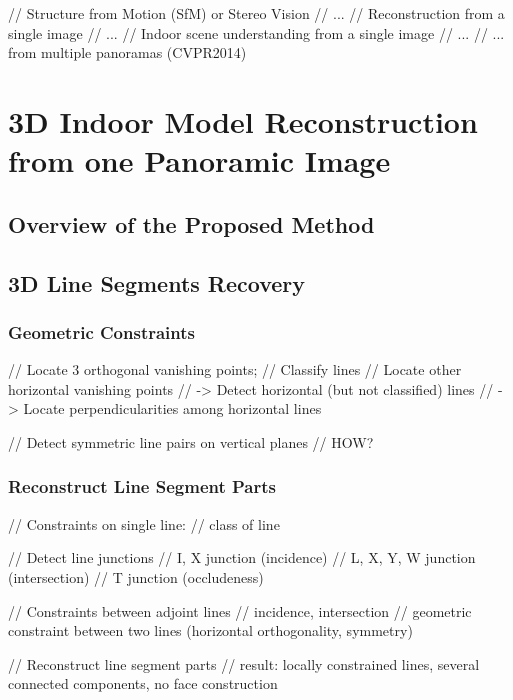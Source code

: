 \documentclass[runningheads]{llncs}
\begin{document}
// Structure from Motion (SfM) or Stereo Vision
// ...
// Reconstruction from a single image
// ...
// Indoor scene understanding from a single image
// ...
// ... from multiple panoramas (CVPR2014)

\section{3D Indoor Model Reconstruction from one Panoramic Image}

\subsection{Overview of the Proposed Method}



\subsection{3D Line Segments Recovery}

\subsubsection {Geometric Constraints}

// Locate 3 orthogonal vanishing points;
// Classify lines
// Locate other horizontal vanishing points
// -> Detect horizontal (but not classified) lines
// -> Locate perpendicularities among horizontal lines

// Detect symmetric line pairs on vertical planes
// HOW?

\subsubsection {Reconstruct Line Segment Parts}

// Constraints on single line:
//   class of line

// Detect line junctions
//   I, X junction (incidence)
//   L, X, Y, W junction (intersection)
//   T junction (occludeness)

// Constraints between adjoint lines
//   incidence, intersection
//   geometric constraint between two lines (horizontal orthogonality, symmetry)

// Reconstruct line segment parts
// result: locally constrained lines, several connected components, no face construction
\end{document}

